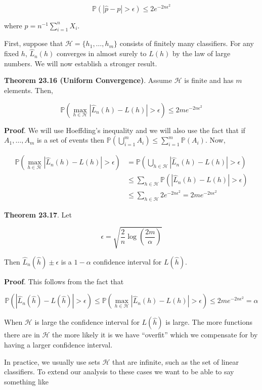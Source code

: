 \[ \mathbb{P}(|\hat{p} - p| > \epsilon) \leq 2 e^{ -2 n \epsilon^2 } \]

where \(\hat{p} = n^{-1} \sum_{i=1}^n X_i\).

First, suppose that \(\mathcal{H} = \{ h_1, \dots, h_m \}\) consists of
finitely many classifiers. For any fixed \(h\), \(\hat{L}_n(h)\)
converges in almost surely to \(L(h)\) by the law of large numbers. We
will now establish a stronger result.

\textbf{Theorem 23.16 (Uniform Convergence)}. Assume \(\mathcal{H}\) is
finite and has \(m\) elements. Then,

\[ \mathbb{P} \left( \max_{h \in \mathcal{H}} |\hat{L}_n(h) - L(h) | > \epsilon \right) \leq 2 m e^{-2 n \epsilon^2} \]

\textbf{Proof}. We will use Hoeffding's inequality and we will also use
the fact that if \(A_1, \dots, A_m\) is a set of events then
\(\mathbb{P}(\bigcup_{i=1}^m A_i) \leq \sum_{i=1}^m \mathbb{P}(A_i)\).
Now,

\[
\begin{align}
\mathbb{P} \left( \max_{h \in \mathcal{H}} |\hat{L}_n(h) - L(h) | > \epsilon \right)
&= \mathbb{P} \left( \bigcup_{h \in \mathcal{H}} |\hat{L}_n(h) - L(h) | > \epsilon \right) \\
& \leq \sum_{h \in \mathcal{H}} \mathbb{P} \left( |\hat{L}_n(h) - L(h) | > \epsilon \right) \\
& \leq \sum_{h \in \mathcal{H}} 2 e^{-2 n \epsilon^2} = 2 m e^{-2 n \epsilon^2}
\end{align}
\]

\textbf{Theorem 23.17}. Let

\[ \epsilon = \sqrt{\frac{2}{n} \log \left( \frac{2m}{\alpha} \right) } \]

Then \(\hat{L}_n(\hat{h}) \pm \epsilon\) is a \(1 - \alpha\) confidence
interval for \(L(\hat{h})\).

\textbf{Proof}. This follows from the fact that

\[
\mathbb{P}(|\hat{L}_n(\hat{h}) - L(\hat{h})| > \epsilon) 
\leq \mathbb{P}( \max_{h \in \mathcal{H}} |\hat{L}_n(h) - L(h) | > \epsilon )
\leq 2 m e^{-2 n \epsilon^2} = \alpha
\]

When \(\mathcal{H}\) is large the confidence interval for \(L(\hat{h})\)
is large. The more functions there are in \(\mathcal{H}\) the more
likely it is we have ``overfit'' which we compensate for by having a
larger confidence interval.

In practice, we usually use sets \(\mathcal{H}\) that are infinite, such
as the set of linear classifiers. To extend our analysis to these cases
we want to be able to say something like

